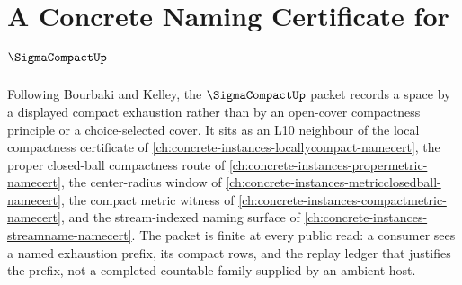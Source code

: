 \chapter{A Concrete Naming Certificate for $\SigmaCompactUp$}
\label{ch:concrete-instances-sigma-compact-namecert}

Following Bourbaki and Kelley, the $\SigmaCompactUp$ packet records a space by a displayed compact exhaustion rather than by an open-cover compactness principle or a choice-selected cover. It sits as an L10 neighbour of the local compactness certificate of \autoref{ch:concrete-instances-locallycompact-namecert}, the proper closed-ball compactness route of \autoref{ch:concrete-instances-propermetric-namecert}, the center-radius window of \autoref{ch:concrete-instances-metricclosedball-namecert}, the compact metric witness of \autoref{ch:concrete-instances-compactmetric-namecert}, and the stream-indexed naming surface of \autoref{ch:concrete-instances-streamname-namecert}. The packet is finite at every public read: a consumer sees a named exhaustion prefix, its compact rows, and the replay ledger that justifies the prefix, not a completed countable family supplied by an ambient host.

